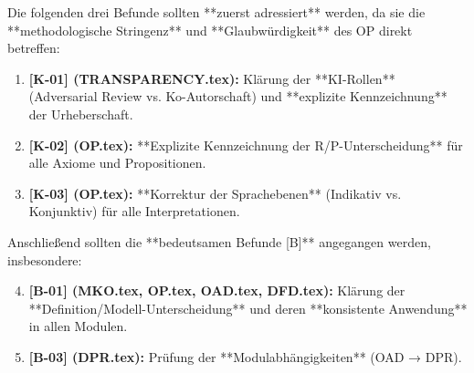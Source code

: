 \documentclass[11pt,a4paper]{article}
\begin{document}
Die folgenden drei Befunde sollten **zuerst adressiert** werden, da sie die **methodologische Stringenz** und **Glaubwürdigkeit** des OP direkt betreffen:

\begin{enumerate}
    \item \textbf{[K-01] (TRANSPARENCY.tex):} Klärung der **KI-Rollen** (Adversarial Review vs. Ko-Autorschaft) und **explizite Kennzeichnung** der Urheberschaft.
    \item \textbf{[K-02] (OP.tex):} **Explizite Kennzeichnung der R/P-Unterscheidung** für alle Axiome und Propositionen.
    \item \textbf{[K-03] (OP.tex):} **Korrektur der Sprachebenen** (Indikativ vs. Konjunktiv) für alle Interpretationen.
\end{enumerate}

Anschließend sollten die **bedeutsamen Befunde [B]** angegangen werden, insbesondere:
\begin{enumerate}
    \setcounter{enumi}{3}
    \item \textbf{[B-01] (MKO.tex, OP.tex, OAD.tex, DFD.tex):} Klärung der **Definition/Modell-Unterscheidung** und deren **konsistente Anwendung** in allen Modulen.
    \item \textbf{[B-03] (DPR.tex):} Prüfung der **Modulabhängigkeiten** (OAD → DPR).
\end{enumerate}
\end{document}
